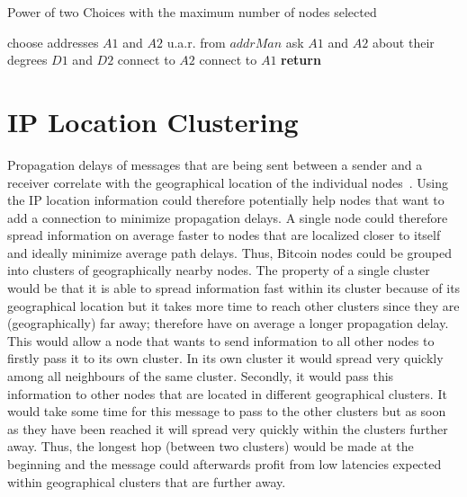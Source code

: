 \documentclass[a4paper, oneside]{discothesis}
\begin{document}
\begin{algorithm}
\caption{Power of two Choices with the maximum number of nodes selected} \label{alg:power2choicesMax}
\begin{algorithmic}[1]
 
    \State choose addresses $A1$ and $A2$ u.a.r. from $addrMan$
    \State ask $A1$ and $A2$ about their degrees $D1$ and $D2$
        \State connect to $A2$
    \Else
        \State connect to $A1$
    \EndIf
\EndWhile
\State \textbf{return} 
\EndProcedure
\end{algorithmic}
\end{algorithm}

\section{IP Location Clustering}
Propagation delays of messages that are being sent between a sender and a receiver correlate with the geographical location of the individual nodes~\cite{geoDelay}.
Using the IP location information could therefore potentially help nodes that want to add a connection to minimize propagation delays. A single node could therefore spread information on average faster to nodes that are localized closer to itself and ideally minimize average path delays. Thus, Bitcoin nodes could be grouped into clusters of geographically nearby nodes. The property of a single cluster would be that it is able to spread information fast within its cluster because of its geographical location but it takes more time to reach other clusters since they are (geographically) far away; therefore have on average a longer propagation delay. 
This would allow a node that wants to send information to all other nodes to firstly pass it to its own cluster. In its own cluster it would spread very quickly among all neighbours of the same cluster. Secondly, it would pass this information to other nodes that are located in different geographical clusters. It would take some time for this message to pass to the other clusters but as soon as they have been reached it will spread very quickly within the clusters further away. Thus, the longest hop (between two clusters) would be made at the beginning and the message could afterwards profit from low latencies expected within geographical clusters that are further away.
\end{document}
